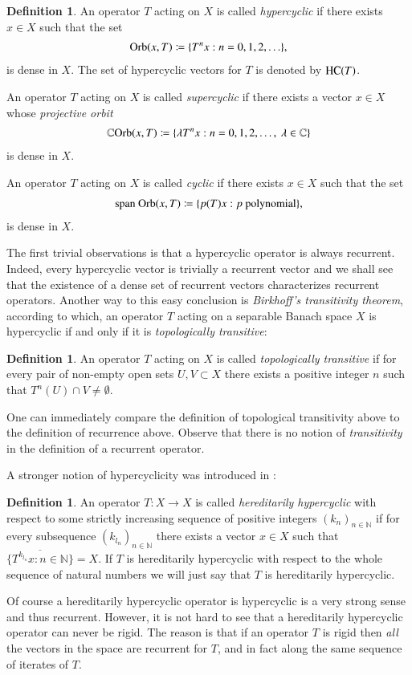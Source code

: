 \documentclass[12pt,leqno]{amsart}
\theoremstyle{plain}
\theoremstyle{definition}
\newtheorem{definition}[equation]{Definition}
\numberwithin{equation}{section}
\begin{document}
\begin{definition}
	An operator $T$ acting on $X$ is called \emph{hypercyclic} if there exists $x\in X$ such that the set 
	\begin{align*}
		{\textnormal{Orb}}(x,T)\coloneqq \{T^nx: n=0,1,2,\ldots\}, 
	\end{align*}
	is dense in $X$. The set of hypercyclic vectors for $T$ is denoted by ${\textnormal{HC} } (T)$. 
	
	An operator $T$ acting on $X$ is called \emph{supercyclic} if there exists a vector $x\in X$ whose \emph{projective orbit} 
	\begin{align*}
		\mathbb C {\textnormal{Orb}}(x,T)\coloneqq\{\lambda T^nx: n=0,1,2,\ldots, \ \lambda \in\mathbb C\} 
	\end{align*}
	is dense in $X$. 
	
	An operator $T$ acting on $X$ is called \emph{cyclic} if there exists $x\in X$ such that the set 
	\begin{align*}
		\textnormal{span}\ {\textnormal{Orb}}(x,T)\coloneqq \{p(T) x:p \ \text{polynomial}\}, 
	\end{align*}
	is dense in $X$.
\end{definition}
The first trivial observations is that a hypercyclic operator is always recurrent. Indeed, every hypercyclic vector is trivially a recurrent vector and we shall see that the existence of a dense set of recurrent vectors characterizes recurrent operators. Another way to this easy conclusion is \emph{Birkhoff's transitivity theorem}, according to which, an operator $T$ acting on a separable Banach space $X$ is hypercyclic if and only if it is \emph{topologically transitive}:
\begin{definition}
	An operator $T$ acting on $X$ is called \emph{topologically transitive} if for every pair of non-empty open sets $U,V\subset X$ there exists a positive integer $n$ such that $T^n(U)\cap V \neq \emptyset$. 
\end{definition}
One can immediately compare the definition of topological transitivity above to the definition of recurrence above. Observe that there is no notion of \emph{transitivity} in the definition of a recurrent operator.

A stronger notion of hypercyclicity was introduced in \cite{BEPES}:
\begin{definition}
	An operator $T:X\rightarrow X$ is called \emph{hereditarily hypercyclic} with respect to some strictly increasing sequence of positive integers $(k_n)_{n\in\mathbb N}$ if for every subsequence $(k_{l_n})_{n\in\mathbb N}$ there exists a vector $x\in X$ such that $\overline{ \{T^{k_{l_n}}x:n\in\mathbb N\}}=X$. If $T$ is hereditarily hypercyclic with respect to the whole sequence of natural numbers we will just say that $T$ is hereditarily hypercyclic. 
\end{definition}
Of course a hereditarily hypercyclic operator is hypercyclic is a very strong sense and thus recurrent. However, it is not hard to see that a hereditarily hypercyclic operator can never be rigid. The reason is that if an operator $T$ is rigid then \emph{all} the vectors in the space are recurrent for $T$, and in fact along the same sequence of iterates of $T$.
\end{document}

